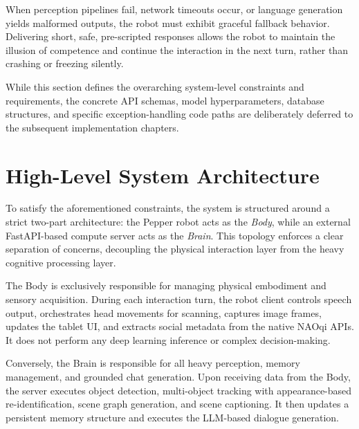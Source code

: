 When perception pipelines fail, network timeouts occur, or language generation yields malformed outputs, the robot must exhibit graceful fallback behavior. Delivering short, safe, pre-scripted responses allows the robot to maintain the illusion of competence and continue the interaction in the next turn, rather than crashing or freezing silently.

While this section defines the overarching system-level constraints and requirements, the concrete API schemas, model hyperparameters, database structures, and specific exception-handling code paths are deliberately deferred to the subsequent implementation chapters.

\section{High-Level System Architecture}\label{sec:high_level_architecture}

To satisfy the aforementioned constraints, the system is structured around a strict two-part architecture: the Pepper robot acts as the \textit{Body}, while an external FastAPI-based compute server acts as the \textit{Brain}. This topology enforces a clear separation of concerns, decoupling the physical interaction layer from the heavy cognitive processing layer.

The Body is exclusively responsible for managing physical embodiment and sensory acquisition. During each interaction turn, the robot client controls speech output, orchestrates head movements for scanning, captures image frames, updates the tablet UI, and extracts social metadata from the native NAOqi APIs. It does not perform any deep learning inference or complex decision-making.

Conversely, the Brain is responsible for all heavy perception, memory management, and grounded chat generation. Upon receiving data from the Body, the server executes object detection, multi-object tracking with appearance-based re-identification, scene graph generation, and scene captioning. It then updates a persistent memory structure and executes the LLM-based dialogue generation.

